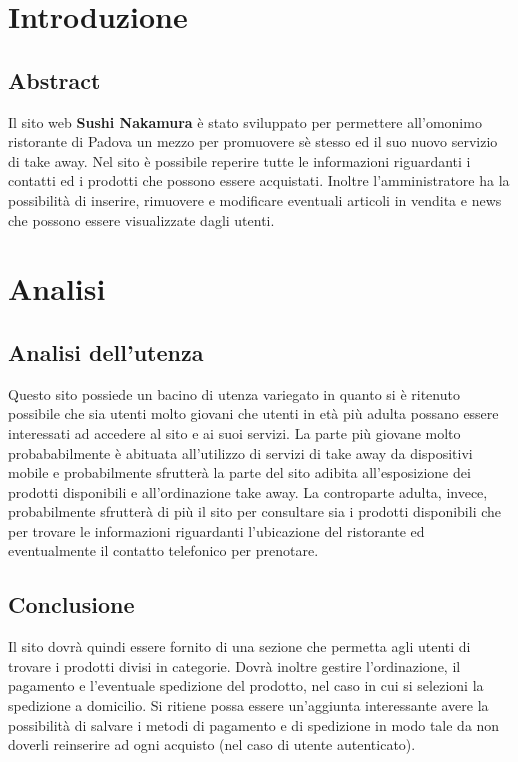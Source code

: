 \documentclass{article}
\begin{document}
	\clearpage
	\renewcommand*\contentsname{Indice}
	\tableofcontents	
	\newpage
	
	\section{Introduzione}
		\subsection{Abstract}
			Il sito web \textbf{Sushi Nakamura} è stato sviluppato per permettere all'omonimo ristorante di Padova un mezzo per promuovere sè stesso ed il suo nuovo servizio di take away.
			Nel sito è possibile reperire tutte le informazioni riguardanti i contatti ed i prodotti che possono essere acquistati.
			Inoltre l'amministratore ha la possibilità di inserire, rimuovere e modificare eventuali articoli in vendita e news che possono essere visualizzate dagli utenti.
	\section{Analisi}
		\subsection{Analisi dell'utenza}
			Questo sito possiede un bacino di utenza variegato in quanto si è ritenuto possibile che sia utenti molto giovani che utenti in età più adulta possano essere interessati ad accedere al sito e ai suoi servizi.
			La parte più giovane molto probababilmente è abituata all'utilizzo di servizi di take away da dispositivi mobile e probabilmente sfrutterà la parte del sito adibita all'esposizione dei prodotti disponibili e all'ordinazione take away.
			La controparte adulta, invece, probabilmente sfrutterà di più il sito per consultare sia i prodotti disponibili che per trovare le informazioni riguardanti l'ubicazione del ristorante ed eventualmente il contatto telefonico per prenotare. 
		\subsection{Conclusione}
			Il sito dovrà quindi essere fornito di una sezione che permetta agli utenti di trovare i prodotti divisi in categorie. Dovrà inoltre gestire l'ordinazione, il pagamento e l'eventuale spedizione del prodotto, nel caso in cui si selezioni la spedizione a domicilio.
			Si ritiene possa essere un'aggiunta interessante avere la possibilità di salvare i metodi di pagamento e di spedizione in modo tale da non doverli reinserire ad ogni acquisto (nel caso di utente autenticato).	
\end{document}
